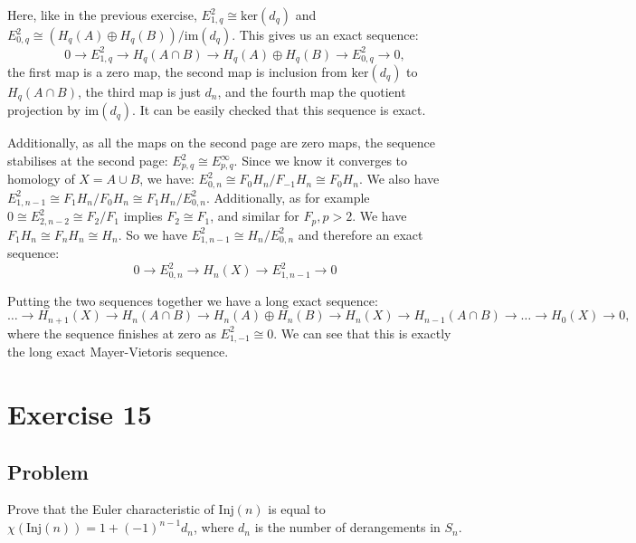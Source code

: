 \documentclass{article}
\begin{document}
Here, like in the previous exercise, $E^2_{1,q} \cong \mathrm{ker}(d_q)$ and $E^2_{0,q} \cong (H_q(A) \oplus H_q(B)) / \mathrm{im}(d_q)$.
This gives us an exact sequence:
\begin{equation*}
0 \to E^2_{1,q} \to H_q(A \cap B) \to H_q(A) \oplus H_q(B) \to E^2_{0,q} \to 0,
\end{equation*}
the first map is a zero map, the second map is inclusion from $\mathrm{ker}(d_q)$ to $H_q(A \cap B)$, the third map is just $d_n$, and the fourth map the quotient projection by $\mathrm{im}(d_q)$. It can be easily checked that this sequence is exact.

Additionally, as all the maps on the second page are zero maps, the sequence stabilises at the second page: $E^2_{p,q} \cong E^\infty_{p,q}$. Since we know it converges to homology of $X=A\cup B$, we have: $E^2_{0,n} \cong F_0 H_n/F_{-1} H_n \cong F_0 H_n$. 
We also have $E^2_{1,n-1} \cong F_1 H_n / F_0 H_n \cong F_1 H_n / E^2_{0,n}$. Additionally, as for example $0 \cong E^2_{2,n-2} \cong F_2/F_1$ implies $F_2 \cong F_1$, and similar for $F_p, p>2$. We have $F_1 H_n \cong F_n H_n \cong H_n$. So we have $E^2_{1,n-1} \cong H_n / E^2_{0,n}$ and therefore an exact sequence:
\begin{equation*}
0 \to E_{0,n}^2 \to H_n(X) \to E_{1,n-1}^2 \to 0
\end{equation*}

Putting the two sequences together we have a long exact sequence:
\begin{equation*}
\dots \to H_{n+1}(X) \to H_{n}(A \cap B) \to H_{n}(A) \oplus H_{n}(B) \to H_n(X) \to H_{n-1}(A \cap B) \to \dots \to H_0(X) \to 0,
\end{equation*}
where the sequence finishes at zero as $E^2_{1,-1} \cong 0$. We can see that this is exactly the long exact Mayer-Vietoris sequence.

\newpage
\section*{Exercise 15}
\subsection*{Problem}
Prove that the Euler characteristic of $\mathrm{Inj}(n)$ is equal to
$\chi(\mathrm{Inj}(n)) = 1 + (-1)^{n-1} d_n$,
where $d_n$ is the number of derangements in $S_n$.
\end{document}
